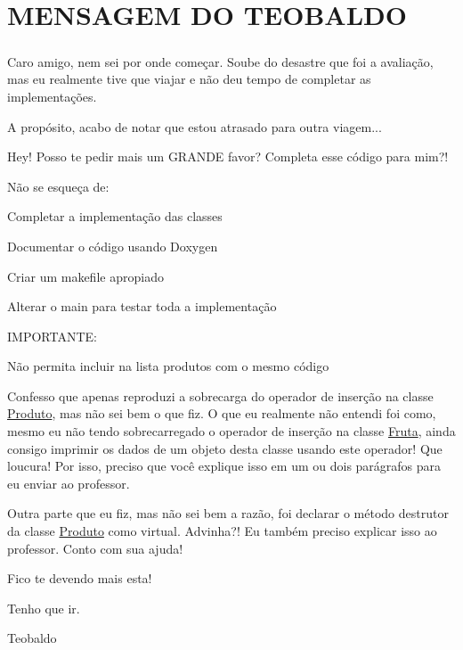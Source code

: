 \section*{M\-E\-N\-S\-A\-G\-E\-M D\-O T\-E\-O\-B\-A\-L\-D\-O}

\subparagraph*{}

Caro amigo, nem sei por onde começar. Soube do desastre que foi a avaliação, mas eu realmente tive que viajar e não deu tempo de completar as implementações.

A propósito, acabo de notar que estou atrasado para outra viagem...

Hey! Posso te pedir mais um G\-R\-A\-N\-D\-E favor? Completa esse código para mim?!

Não se esqueça de\-:
\begin{DoxyItemize}
\item Completar a implementação das classes
\item Documentar o código usando Doxygen
\item Criar um makefile apropiado
\item Alterar o main para testar toda a implementação
\end{DoxyItemize}

I\-M\-P\-O\-R\-T\-A\-N\-T\-E\-:
\begin{DoxyItemize}
\item Não permita incluir na lista produtos com o mesmo código
\item Confesso que apenas reproduzi a sobrecarga do operador de inserção na classe \hyperlink{classProduto}{Produto}, mas não sei bem o que fiz. O que eu realmente não entendi foi como, mesmo eu não tendo sobrecarregado o operador de inserção na classe \hyperlink{classFruta}{Fruta}, ainda consigo imprimir os dados de um objeto desta classe usando este operador! Que loucura! Por isso, preciso que você explique isso em um ou dois parágrafos para eu enviar ao professor.
\item Outra parte que eu fiz, mas não sei bem a razão, foi declarar o método destrutor da classe \hyperlink{classProduto}{Produto} como virtual. Advinha?! Eu também preciso explicar isso ao professor. Conto com sua ajuda!
\end{DoxyItemize}

Fico te devendo mais esta!

Tenho que ir.

Teobaldo 